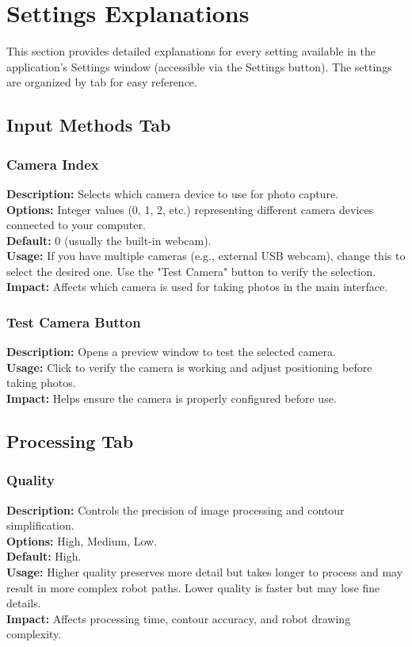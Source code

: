 \documentclass[a4paper,12pt]{article}
\begin{document}
\section{Settings Explanations}

This section provides detailed explanations for every setting available in the application's Settings window (accessible via the Settings button). The settings are organized by tab for easy reference.

\subsection{Input Methods Tab}

\subsubsection{Camera Index}
\textbf{Description:} Selects which camera device to use for photo capture.\\
\textbf{Options:} Integer values (0, 1, 2, etc.) representing different camera devices connected to your computer.\\
\textbf{Default:} 0 (usually the built-in webcam).\\
\textbf{Usage:} If you have multiple cameras (e.g., external USB webcam), change this to select the desired one. Use the "Test Camera" button to verify the selection.\\
\textbf{Impact:} Affects which camera is used for taking photos in the main interface.

\subsubsection{Test Camera Button}
\textbf{Description:} Opens a preview window to test the selected camera.\\
\textbf{Usage:} Click to verify the camera is working and adjust positioning before taking photos.\\
\textbf{Impact:} Helps ensure the camera is properly configured before use.

\subsection{Processing Tab}

\subsubsection{Quality}
\textbf{Description:} Controls the precision of image processing and contour simplification.\\
\textbf{Options:} High, Medium, Low.\\
\textbf{Default:} High.\\
\textbf{Usage:} Higher quality preserves more detail but takes longer to process and may result in more complex robot paths. Lower quality is faster but may lose fine details.\\
\textbf{Impact:} Affects processing time, contour accuracy, and robot drawing complexity.
\end{document}
